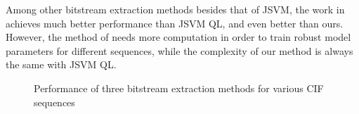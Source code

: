 \documentclass[journal]{IEEEtran}
\begin{document}
Among other bitstream extraction methods besides that of JSVM, the work in \cite{Maani09} achieves much better performance than JSVM QL, and even better than ours. However, the method of \cite{Maani09} needs more computation in order to train robust model parameters for different sequences, while the complexity of our method is always the same with JSVM QL.

\begin{figure}[t]
\centering
{}
\qquad
{}
\caption{Performance of three bitstream extraction methods for various CIF sequences}
\label{fig:extraction-performance}
\end{figure}
\end{document}
